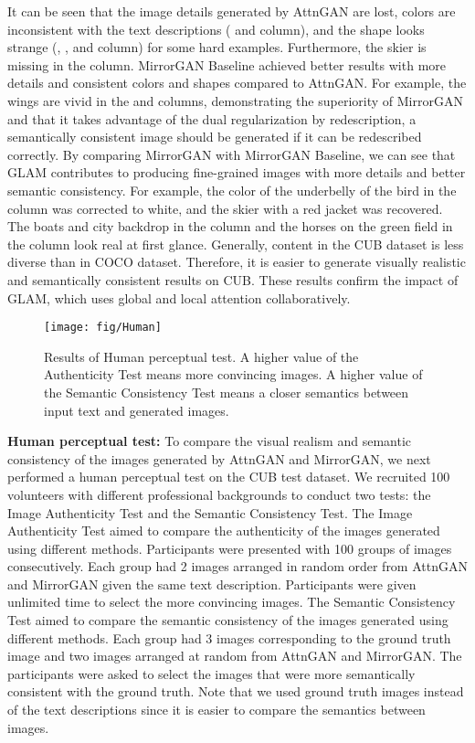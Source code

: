 \documentclass[10pt,twocolumn,letterpaper]{article}
\begin{document}
It can be seen that the image details generated by AttnGAN are lost, colors are inconsistent with the text descriptions ( and  column), and the shape looks strange (, ,  and  column) for some hard examples. Furthermore, the skier is missing in the  column. MirrorGAN Baseline achieved better results with more details and consistent colors and shapes compared to AttnGAN. For example, the wings are vivid in the  and  columns, demonstrating the superiority of MirrorGAN and that it takes advantage of the dual regularization by redescription,  a semantically consistent image should be generated if it can be redescribed correctly. By comparing MirrorGAN with MirrorGAN Baseline, we can see that GLAM contributes to producing fine-grained images with more details and better semantic consistency. For example, the color of the underbelly of the bird in the  column was corrected to white, and the skier with a red jacket was recovered. The boats and city backdrop in the  column and the horses on the green field in the  column look real at first glance. Generally, content in the CUB dataset is less diverse than in COCO dataset. Therefore, it is easier to generate visually realistic and semantically consistent results on CUB. These results confirm the impact of GLAM, which uses global and local attention collaboratively.

\begin{figure}[tb!]
\centering
\noindent\texttt{[image: fig/Human]}
\protect\caption{Results of Human perceptual test. A higher value of the Authenticity Test means more convincing images. A higher value of the Semantic Consistency Test means a closer semantics between input text and generated images.}
\label{fig:Human}
\end{figure}

\textbf{Human perceptual test: }To compare the visual realism and semantic consistency of the images generated by AttnGAN and MirrorGAN, we next performed a human perceptual test on the CUB test dataset. We recruited 100 volunteers with different professional backgrounds to conduct two tests: the Image Authenticity Test and the Semantic Consistency Test. The Image Authenticity Test aimed to compare the authenticity of the images generated using different methods. Participants were presented with 100 groups of images consecutively. Each group had 2 images arranged in random order from AttnGAN and MirrorGAN given the same text description. Participants were given unlimited time to select the more convincing images. The Semantic Consistency Test aimed to compare the semantic consistency of the images generated using different methods. Each group had 3 images corresponding to the ground truth image and two images arranged at random from AttnGAN and MirrorGAN. The participants were asked to select the images that were more semantically consistent with the ground truth. Note that we used ground truth images instead of the text descriptions since it is easier to compare the semantics between images.
\end{document}
